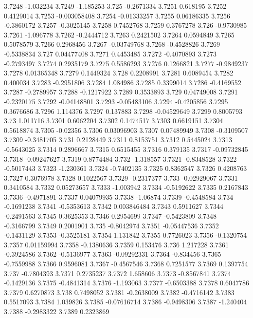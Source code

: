 3.7248  -1.032234
3.7249  -1.185253
3.725  -0.2671334
3.7251  0.618195
3.7252  0.4129014
3.7253  -0.003058408
3.7254  -0.01333257
3.7255  0.06186335
3.7256  -0.3860172
3.7257  -0.3025145
3.7258  0.7452768
3.7259  0.3767278
3.726  -0.9730985
3.7261  -1.096778
3.7262  -0.2444712
3.7263  0.2421502
3.7264  0.0594849
3.7265  0.5078579
3.7266  0.2968456
3.7267  -0.03749768
3.7268  -0.4528826
3.7269  -0.5338834
3.727  0.04477408
3.7271  0.4453485
3.7272  -0.4070893
3.7273  -0.2793497
3.7274  0.2935179
3.7275  0.5586293
3.7276  0.1266821
3.7277  -0.9849237
3.7278  0.01365348
3.7279  0.1449324
3.728  0.2208991
3.7281  0.6089454
3.7282  0.400034
3.7283  -0.2951806
3.7284  1.084986
3.7285  0.3399014
3.7286  -0.4169552
3.7287  -0.2789957
3.7288  -0.1217922
3.7289  0.3533893
3.729  0.04749008
3.7291  -0.2320175
3.7292  -0.04148801
3.7293  -0.05483106
3.7294  -0.4205856
3.7295  0.3676686
3.7296  1.114376
3.7297  0.137883
3.7298  -0.04529649
3.7299  0.8005793
3.73  1.011716
3.7301  0.6062204
3.7302  0.1474517
3.7303  0.6619151
3.7304  0.5618874
3.7305  -0.02356
3.7306  0.03096903
3.7307  0.07489949
3.7308  -0.3109507
3.7309  -0.3481705
3.731  0.2128449
3.7311  0.8153751
3.7312  0.5445024
3.7313  -0.5643025
3.7314  0.2896667
3.7315  0.6515455
3.7316  0.379135
3.7317  -0.09732845
3.7318  -0.09247627
3.7319  0.8774484
3.732  -1.318557
3.7321  -0.8348528
3.7322  -0.5017443
3.7323  -1.230361
3.7324  -0.7402135
3.7325  0.8362547
3.7326  0.4208763
3.7327  0.3076978
3.7328  0.1022567
3.7329  -0.2317377
3.733  -0.02929067
3.7331  0.3410584
3.7332  0.05273657
3.7333  -1.003942
3.7334  -0.5192622
3.7335  0.2167843
3.7336  -0.4971891
3.7337  0.04079935
3.7338  -1.06874
3.7339  -0.4548584
3.734  -0.1691238
3.7341  -0.5353613
3.7342  0.003846484
3.7343  0.5911627
3.7344  -0.2491563
3.7345  0.3625353
3.7346  0.2954699
3.7347  -0.5423809
3.7348  -0.3166799
3.7349  0.2001901
3.735  -0.8042974
3.7351  -0.05447536
3.7352  -0.1431129
3.7353  -0.3525181
3.7354  1.131842
3.7355  0.7726023
3.7356  -0.1320754
3.7357  0.01159994
3.7358  -0.1380636
3.7359  0.153476
3.736  1.217228
3.7361  -0.3924586
3.7362  -0.5136977
3.7363  -0.09292331
3.7364  -0.834456
3.7365  -0.7559988
3.7366  0.9596081
3.7367  -0.4567546
3.7368  0.7251577
3.7369  0.1397754
3.737  -0.7804393
3.7371  0.2735237
3.7372  1.658606
3.7373  -0.8567841
3.7374  -0.1429136
3.7375  -0.4841314
3.7376  -1.193063
3.7377  -0.6503388
3.7378  0.6047786
3.7379  0.6270873
3.738  0.7498052
3.7381  -0.2638009
3.7382  -0.4716142
3.7383  0.5517093
3.7384  1.039826
3.7385  -0.07616714
3.7386  -0.9498306
3.7387  -1.240404
3.7388  -0.2983322
3.7389  0.2323869
